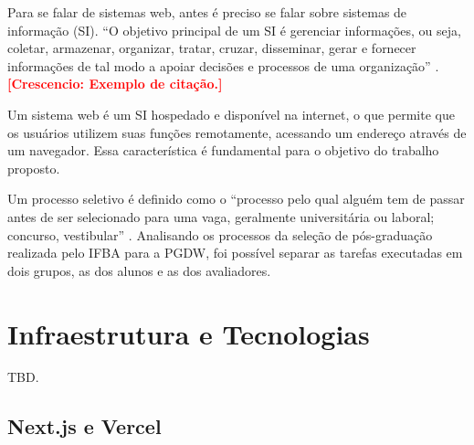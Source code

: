 \documentclass[12pt]{article}
\newcommand{\cl}[1]{\textcolor{red}{\textbf{[Crescencio: #1]}}}
\begin{document}




Para se falar de sistemas web, antes é preciso se falar sobre sistemas de informação (SI). ``O objetivo principal de um SI é gerenciar informações, ou seja, coletar, armazenar, organizar, tratar, cruzar, disseminar, gerar e fornecer informações de tal modo a apoiar decisões e processos de uma organização'' \cite[7]{SI}. \cl{Exemplo de citação.}

Um sistema web é um SI hospedado e disponível na internet, o que permite que os usuários utilizem suas funções remotamente, acessando um endereço através de um navegador. Essa característica é fundamental para o objetivo do trabalho proposto.



Um processo seletivo é definido como o ``processo pelo qual alguém tem de passar antes de ser selecionado para uma vaga, geralmente universitária ou laboral; concurso, vestibular'' \cite{processoseletivo}. Analisando os processos da seleção de pós-graduação realizada pelo IFBA para a PGDW, foi possível separar as tarefas executadas em dois grupos, as dos alunos e as dos avaliadores.







\section{Infraestrutura e Tecnologias} \label{sec:tecnologias}

TBD.

\subsection{Next.js e Vercel}
\end{document}
